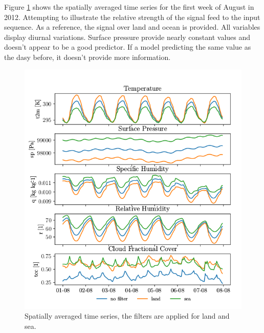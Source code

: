 Figure \ref{fig:random_week} shows the spatially averaged time series for the first week of August in 2012. Attempting to illustrate the relative strength of the signal feed to the input sequence. As a reference, the signal over land and ocean is provided. All variables display diurnal variations. Surface pressure provide nearly constant values and doesn't appear to be a good predictor. If a model predicting the same value as the dasy before, it doesn't provide more information.
\begin{figure}[ht]
    \centering
    \includegraphics{python_figs/spatially_averaged_one_week_from_2012-08-01.png}
    \caption{Spatially averaged time series, the filters are applied for land and sea.}
    \label{fig:random_week}
\end{figure}



